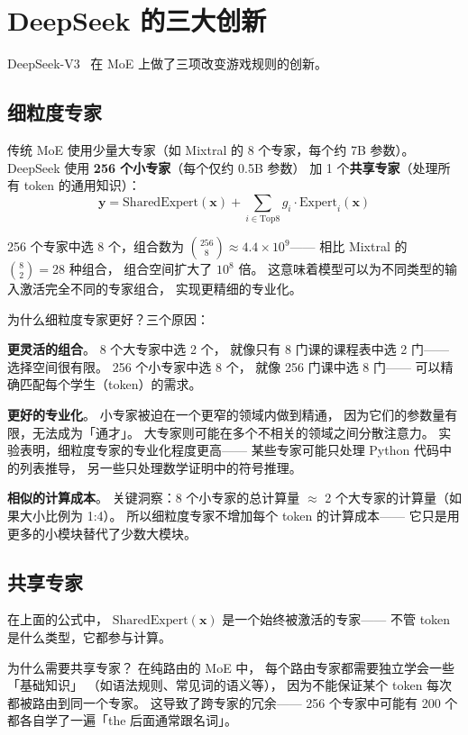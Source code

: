 \section{DeepSeek 的三大创新}

DeepSeek-V3~\cite{deepseekv3} 在 MoE 上做了三项改变游戏规则的创新。

\subsection{细粒度专家}

传统 MoE 使用少量大专家（如 Mixtral 的 8 个专家，每个约 7B 参数）。
DeepSeek 使用 \textbf{256 个小专家}（每个仅约 0.5B 参数）
加 1 个\textbf{共享专家}（处理所有 token 的通用知识）：
\begin{equation}
  \mathbf{y} = \mathrm{SharedExpert}(\mathbf{x})
  + \sum_{i \in \mathrm{Top8}} g_i \cdot \mathrm{Expert}_i(\mathbf{x})
\end{equation}

256 个专家中选 8 个，组合数为
$\binom{256}{8} \approx 4.4 \times 10^{9}$——
相比 Mixtral 的 $\binom{8}{2} = 28$ 种组合，
组合空间扩大了 $10^{8}$ 倍。
这意味着模型可以为不同类型的输入激活完全不同的专家组合，
实现更精细的专业化。

为什么细粒度专家更好？三个原因：

\textbf{更灵活的组合}。
8 个大专家中选 2 个，
就像只有 8 门课的课程表中选 2 门——
选择空间很有限。
256 个小专家中选 8 个，
就像 256 门课中选 8 门——
可以精确匹配每个学生（token）的需求。

\textbf{更好的专业化}。
小专家被迫在一个更窄的领域内做到精通，
因为它们的参数量有限，无法成为「通才」。
大专家则可能在多个不相关的领域之间分散注意力。
实验表明，细粒度专家的专业化程度更高——
某些专家可能只处理 Python 代码中的列表推导，
另一些只处理数学证明中的符号推理。

\textbf{相似的计算成本}。
关键洞察：8 个小专家的总计算量
$\approx$ 2 个大专家的计算量（如果大小比例为 1:4）。
所以细粒度专家不增加每个 token 的计算成本——
它只是用更多的小模块替代了少数大模块。

\subsection{共享专家}

在上面的公式中，
$\mathrm{SharedExpert}(\mathbf{x})$ 是一个始终被激活的专家——
不管 token 是什么类型，它都参与计算。

为什么需要共享专家？
在纯路由的 MoE 中，
每个路由专家都需要独立学会一些「基础知识」
（如语法规则、常见词的语义等），
因为不能保证某个 token 每次都被路由到同一个专家。
这导致了跨专家的冗余——
256 个专家中可能有 200 个都各自学了一遍「the 后面通常跟名词」。

